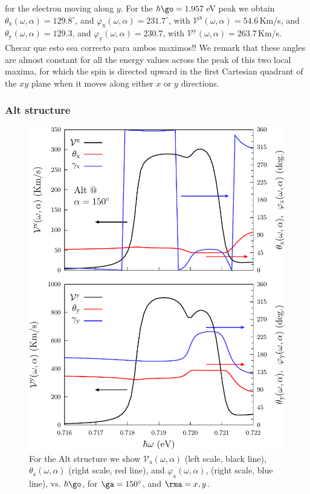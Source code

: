 \documentclass[prb,11pt,tightenlines,twocolumn,aps]{revtex4-1}
\begin{document}
for the electron moving along $y$.
% 
For the $\hbar\go=1.957$\,eV peak we obtain 
$\theta_{\mathrm{x}} (\omega,\alpha) = 129.8^{\circ}$, and 
$\varphi_{\mathrm{x}} (\omega,\alpha) = 231.7^{\circ}$, with 
$\mathcal{V}^{\mathrm{x}} (\omega,\alpha) = 54.6$\,Km/s, and
$\theta_{\mathrm{y}}(\omega,\alpha) =129.3$, and
$\varphi_{\mathrm{y}}(\omega,\alpha) = 230.7$, with 
$\mathcal{V}^{\mathrm{y}} (\omega,\alpha) = 263.7$\,Km/s. 
{\color{red}Checar que esto sea correcto para ambos maximos!!
We remark that these angles are almost
constant for all the energy values across the peak of this two local maxima, for
which the spin is directed upward in the first Cartesian quadrant of the $xy$
plane when it moves along either $x$ or $y$ directions. 
}

\subsubsection{Alt structure}

\begin{figure}[tb]
\centering
\includegraphics[width=\linewidth]{altplots/alt-vx-vy-w1}
\caption{For the Alt structure we show
$\mathcal{V}_{\mathrm{a}} (\omega,\alpha)$ (left scale, black line),
$\theta_{\mathrm{a}} (\omega,\alpha)$ (right scale, red line), and
$\varphi_{\mathrm{a}} (\omega,\alpha)$, (right scale, blue line), vs.
$\hbar\go$, for $\ga=150^\circ$, and $\rma=x,y$. }
\label{fig:alt-vx-vy-w1}
\end{figure}
\end{document}
